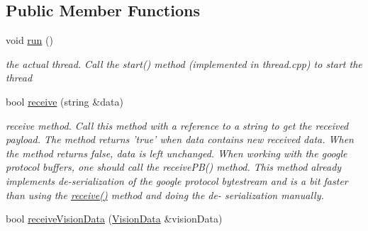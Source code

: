 \subsection*{Public Member Functions}
\begin{DoxyCompactItemize}
\item 
void \hyperlink{class_wificlient_a0f1ded9f8252ef5094915c6ff9bf1d40}{run} ()
\begin{DoxyCompactList}\small\item\em the actual thread. Call the start() method (implemented in thread.\-cpp) to start the thread \end{DoxyCompactList}\item 
\hypertarget{class_wificlient_aab4bf3fdc0dc322772f16fa2a19490c6}{bool \hyperlink{class_wificlient_aab4bf3fdc0dc322772f16fa2a19490c6}{receive} (string \&data)}\label{class_wificlient_aab4bf3fdc0dc322772f16fa2a19490c6}

\begin{DoxyCompactList}\small\item\em receive method. Call this method with a reference to a string to get the received payload. The method returns 'true' when data contains new received data. When the method returns false, data is left unchanged. When working with the google protocol buffers, one should call the receive\-P\-B() method. This method already implements de-\/serialization of the google protocol bytestream and is a bit faster than using the \hyperlink{class_wificlient_aab4bf3fdc0dc322772f16fa2a19490c6}{receive()} method and doing the de-\/ serialization manually. \end{DoxyCompactList}\item 
\hypertarget{class_wificlient_a40c3a8952dd678120ac2d516b8e853b8}{bool \hyperlink{class_wificlient_a40c3a8952dd678120ac2d516b8e853b8}{receive\-Vision\-Data} (\hyperlink{class_vision_data}{Vision\-Data} \&vision\-Data)}\label{class_wificlient_a40c3a8952dd678120ac2d516b8e853b8}


\end{DoxyCompactItemize}

